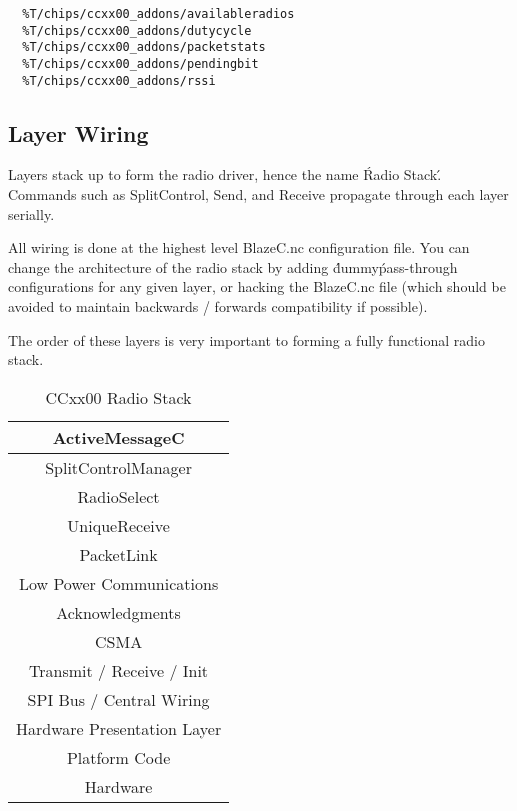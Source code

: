 \documentclass{article}
\begin{document}
\begin{verbatim}
  %T/chips/ccxx00_addons/availableradios
  %T/chips/ccxx00_addons/dutycycle
  %T/chips/ccxx00_addons/packetstats
  %T/chips/ccxx00_addons/pendingbit
  %T/chips/ccxx00_addons/rssi
\end{verbatim}

\subsection{Layer Wiring}
Layers stack up to form the radio driver, hence the name \'Radio Stack\'. Commands
such as SplitControl, Send, and Receive propagate through each layer serially.

All wiring is done at the highest level BlazeC.nc configuration file. You can 
change the architecture of the radio stack by adding \'dummy\' pass-through configurations
for any given layer, or hacking the BlazeC.nc file (which should be avoided to maintain
backwards / forwards compatibility if possible).

The order of these layers is very important to forming a fully functional radio stack.

\begin{table}
	\centering
		\begin{tabular}{|c|}
		  \hline
      ActiveMessageC \\ \hline \hline
      SplitControlManager \\ \hline
      RadioSelect \\ \hline
      UniqueReceive \\ \hline
      PacketLink \\ \hline
      Low Power Communications \\ \hline
      Acknowledgments \\ \hline
      CSMA \\ \hline \hline
      Transmit / Receive / Init \\ \hline
      SPI Bus / Central Wiring \\ \hline
      \hline
      Hardware Presentation Layer \\ \hline
      Platform Code \\ \hline
      \hline
      Hardware \\
      \hline
      
   	\end{tabular}
	\caption{CCxx00 Radio Stack}
	\label{tab:CCxx00RadioStack}
\end{table}
\end{document}
